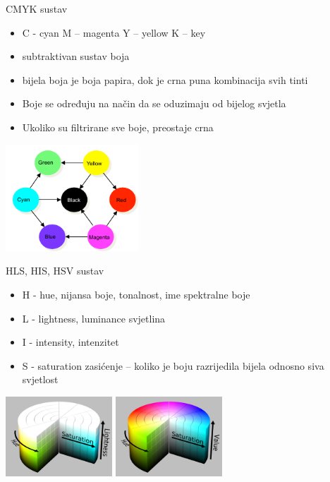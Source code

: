 \documentclass[9pt]{beamer}
\begin{document}
\begin{frame}{CMYK sustav}
	\begin{itemize}
		\item C - cyan M – magenta Y – yellow K – key
		\item subtraktivan sustav boja
		\item bijela boja je boja papira, dok je crna puna kombinacija svih tinti
		\item Boje se određuju na način da se oduzimaju od bijelog svjetla
		\item Ukoliko su filtrirane sve boje, preostaje crna
	\end{itemize}
	\begin{center}
		\includegraphics[height=4cm]{slike/cmyk.png}
	\end{center}
\end{frame}

\begin{frame}{HLS, HIS, HSV sustav}
	\begin{itemize}
		\item H - hue, nijansa boje, tonalnost, ime spektralne boje
		\item L - lightness, luminance svjetlina
		\item I - intensity, intenzitet
		\item S - saturation zasićenje – koliko je boju
		razrijedila bijela odnosno siva svjetlost
	\end{itemize}
	\begin{center}
		\includegraphics[height=3cm]{slike/04-hsl_color_solid_cylinder_alpha_lowgamma.png}
		\includegraphics[height=3cm]{slike/04-hsv_color_solid_cylinder_alpha_lowgamma.png}
	\end{center}
\end{frame}
\end{document}

